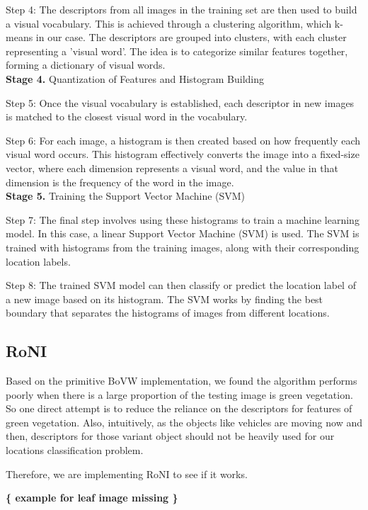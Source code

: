 \documentclass[conference]{IEEEtran}
\begin{document}
Step 4: The descriptors from all images in the training set are then used to build a visual vocabulary. This is achieved through a clustering algorithm, which k-means in our case. The descriptors are grouped into clusters, with each cluster representing a 'visual word'. The idea is to categorize similar features together, forming a dictionary of visual words.\\

\textbf{Stage 4.} Quantization of Features and Histogram Building

Step 5: Once the visual vocabulary is established, each descriptor in new images is matched to the closest visual word in the vocabulary. 

Step 6: For each image, a histogram is then created based on how frequently each visual word occurs. This histogram effectively converts the image into a fixed-size vector, where each dimension represents a visual word, and the value in that dimension is the frequency of the word in the image.\\

\textbf{Stage 5.} Training the Support Vector Machine (SVM)

Step 7: The final step involves using these histograms to train a machine learning model. In this case, a linear Support Vector Machine (SVM) is used. The SVM is trained with histograms from the training images, along with their corresponding location labels. 

Step 8: The trained SVM model can then classify or predict the location label of a new image based on its histogram. The SVM works by finding the best boundary that separates the histograms of images from different locations.

\subsection{RoNI}

Based on the primitive BoVW implementation, we found the algorithm performs poorly when there is a large proportion of the testing image is green vegetation. So one direct attempt is to reduce the reliance on the descriptors for features of green vegetation. Also, intuitively, as the objects like vehicles are moving now and then, descriptors for those variant object should not be heavily used for our locations classification problem. 

Therefore, we are implementing RoNI to see if it works.

\textbf{ \{ example for leaf image missing \} }
\end{document}
